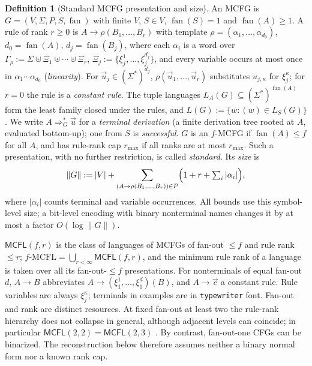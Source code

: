 \documentclass[11pt]{article}
\numberwithin{equation}{section}
\theoremstyle{plain}
\theoremstyle{definition}
\newtheorem{definition}[theorem]{Definition}
\theoremstyle{remark}
\newcommand{\tuple}[1]{\vec{#1}}
\newcommand{\fan}{\operatorname{fan}}
\theoremstyle{plain}
\begin{document}
\begin{definition}[Standard MCFG presentation and size]
\label{def:standard-mcfg}
An MCFG \cite{SekiEtAl1991,Kallmeyer2010} is
$G=(V,\Sigma,P,S,\fan)$ with finite $V$, $S\in V$, $\fan(S)=1$ and
$\fan(A)\ge1$.  A rule of rank $r\ge0$ is
$A\to\rho(B_1,\ldots,B_r)$ with template
$\rho=(\alpha_1,\ldots,\alpha_{d_0})$, $d_0=\fan(A)$, $d_j=\fan(B_j)$, where
each $\alpha_i$ is a word over
$\Gamma_\rho:=\Sigma\uplus\Xi_1\uplus\cdots\uplus\Xi_r$,
$\Xi_j:=\{\xi_j^1,\ldots,\xi_j^{d_j}\}$, and every variable occurs at most once
in $\alpha_1\cdots\alpha_{d_0}$ (\emph{linearity}).  For $\tuple u_j\in(\Sigma^*)^{d_j}$,
$\rho(\tuple u_1,\ldots,\tuple u_r)$ substitutes $u_{j,\kappa}$ for
$\xi_j^\kappa$; for $r=0$ the rule is a \emph{constant rule}.  The tuple
languages $L_A(G)\subseteq(\Sigma^*)^{\fan(A)}$ form the least family closed
under the rules, and $L(G):=\{w:(w)\in L_S(G)\}$.  We write
$A\Rightarrow_G^*\tuple u$ for a \emph{terminal derivation} (a finite derivation
tree rooted at $A$, evaluated bottom-up); one from $S$ is \emph{successful}.
$G$ is an $f$-MCFG if $\fan(A)\le f$ for all $A$, and has rule-rank cap
$r_{\max}$ if all ranks are at most $r_{\max}$.  Such a presentation, with no
further restriction, is called \emph{standard}.  Its \emph{size} is
\[
 \|G\|:=|V|+\sum_{(A\to\rho(B_1,\ldots,B_r))\in P}
 \Bigl(1+r+\textstyle\sum_{i}|\alpha_i|\Bigr),
\]
where $|\alpha_i|$ counts terminal and variable occurrences.  All
bounds use this symbol-level size; a bit-level encoding with binary
nonterminal names changes it by at most a factor $O(\log\|G\|)$.
\end{definition}

$\mathsf{MCFL}(f,r)$ is the class of languages of MCFGs of fan-out $\le f$ and
rule rank $\le r$; $f\text{-}\mathrm{MCFL}=\bigcup_{r<\infty}\mathsf{MCFL}(f,r)$,
and the minimum rule rank of a language is taken over all its fan-out-$\le f$
presentations.  For nonterminals of equal fan-out $d$, $A\to B$ abbreviates
$A\to(\xi_1^1,\ldots,\xi_1^d)(B)$, and $A\to\tuple c$ a constant rule.  Rule
variables are always $\xi_j^\kappa$; terminals in examples are in
\texttt{typewriter} font.  Fan-out and rank are distinct resources.  At fixed fan-out at least
two the rule-rank hierarchy does not collapse in general, although adjacent
levels can coincide; in particular
$\mathsf{MCFL}(2,2)=\mathsf{MCFL}(2,3)$
\cite{RambowSatta1999,GomezRodriguezEtAl2009}.  By contrast, fan-out-one
CFGs can be binarized.  The reconstruction below therefore assumes neither
a binary normal form nor a known rank cap.
\end{document}

